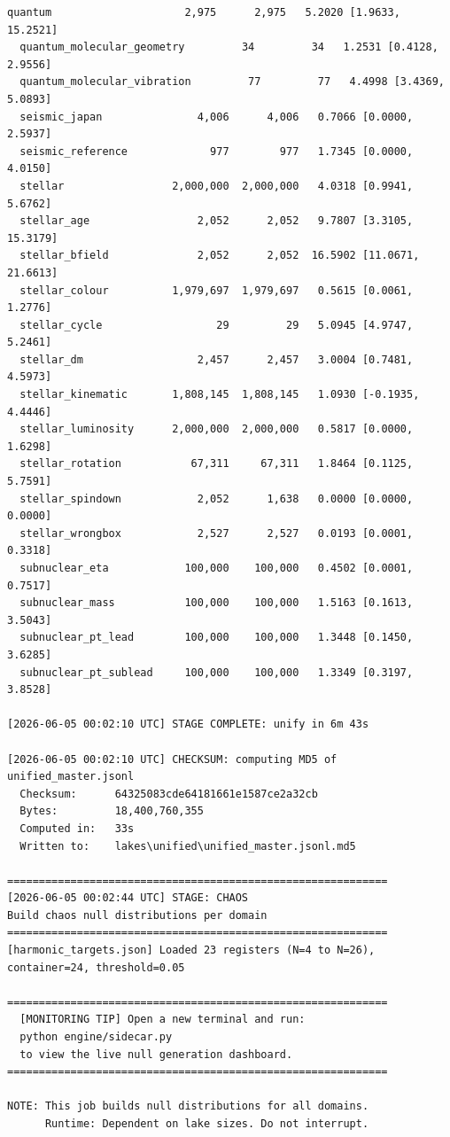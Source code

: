 \documentclass[11pt, letterpaper, openany]{book}
\begin{document}
\begin{empiricalbox}
\begin{lstlisting}[style=terminal]
  quantum                     2,975      2,975   5.2020 [1.9633, 15.2521]
  quantum_molecular_geometry         34         34   1.2531 [0.4128, 2.9556]
  quantum_molecular_vibration         77         77   4.4998 [3.4369, 5.0893]
  seismic_japan               4,006      4,006   0.7066 [0.0000, 2.5937]
  seismic_reference             977        977   1.7345 [0.0000, 4.0150]
  stellar                 2,000,000  2,000,000   4.0318 [0.9941, 5.6762]
  stellar_age                 2,052      2,052   9.7807 [3.3105, 15.3179]
  stellar_bfield              2,052      2,052  16.5902 [11.0671, 21.6613]
  stellar_colour          1,979,697  1,979,697   0.5615 [0.0061, 1.2776]
  stellar_cycle                  29         29   5.0945 [4.9747, 5.2461]
  stellar_dm                  2,457      2,457   3.0004 [0.7481, 4.5973]
  stellar_kinematic       1,808,145  1,808,145   1.0930 [-0.1935, 4.4446]
  stellar_luminosity      2,000,000  2,000,000   0.5817 [0.0000, 1.6298]
  stellar_rotation           67,311     67,311   1.8464 [0.1125, 5.7591]
  stellar_spindown            2,052      1,638   0.0000 [0.0000, 0.0000]
  stellar_wrongbox            2,527      2,527   0.0193 [0.0001, 0.3318]
  subnuclear_eta            100,000    100,000   0.4502 [0.0001, 0.7517]
  subnuclear_mass           100,000    100,000   1.5163 [0.1613, 3.5043]
  subnuclear_pt_lead        100,000    100,000   1.3448 [0.1450, 3.6285]
  subnuclear_pt_sublead     100,000    100,000   1.3349 [0.3197, 3.8528]

[2026-06-05 00:02:10 UTC] STAGE COMPLETE: unify in 6m 43s

[2026-06-05 00:02:10 UTC] CHECKSUM: computing MD5 of unified_master.jsonl
  Checksum:      64325083cde64181661e1587ce2a32cb
  Bytes:         18,400,760,355
  Computed in:   33s
  Written to:    lakes\unified\unified_master.jsonl.md5

============================================================
[2026-06-05 00:02:44 UTC] STAGE: CHAOS
Build chaos null distributions per domain
============================================================
[harmonic_targets.json] Loaded 23 registers (N=4 to N=26), container=24, threshold=0.05

============================================================
  [MONITORING TIP] Open a new terminal and run:
  python engine/sidecar.py
  to view the live null generation dashboard.
============================================================

NOTE: This job builds null distributions for all domains.
      Runtime: Dependent on lake sizes. Do not interrupt.


\end{lstlisting}
\end{empiricalbox}
\end{document}
